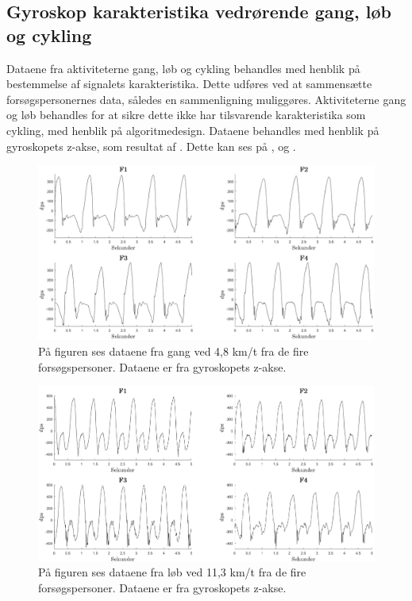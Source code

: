 \subsection{Gyroskop karakteristika vedrørende gang, løb og cykling}
Dataene fra aktiviteterne gang, løb og cykling behandles med henblik på bestemmelse af signalets karakteristika. Dette udføres ved at sammensætte forsøgspersonernes data, således en sammenligning muliggøres. Aktiviteterne gang og løb behandles for at sikre dette ikke har tilsvarende karakteristika som cykling, med henblik på algoritmedesign. Dataene behandles med henblik på gyroskopets z-akse, som resultat af . Dette kan ses på ,  og .
\begin{figure}[H]
	\centering
	\includegraphics[scale=0.5]{figures/qBilag/gang_gyro}
	\caption{På figuren ses dataene fra gang ved 4,8 km/t fra de fire forsøgspersoner. Dataene er fra gyroskopets z-akse.}
	\label{fig:Ap_cykling1}
\end{figure}\vspace{-.25cm}

\begin{figure}[H]
	\centering
	\includegraphics[scale=0.5]{figures/qBilag/loeb_gyro}
	\caption{På figuren ses dataene fra løb ved 11,3 km/t fra de fire forsøgspersoner. Dataene er fra gyroskopets z-akse.}
	\label{fig:Ap_cykling2}
\end{figure}\vspace{-.25cm}

